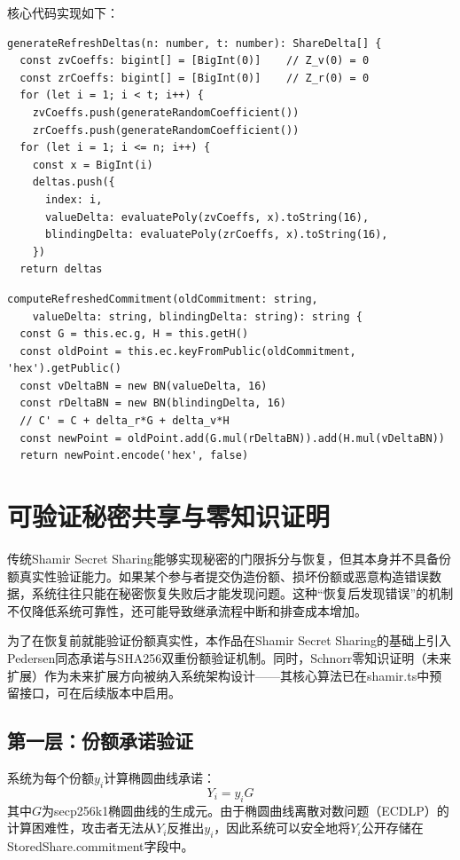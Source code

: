 \documentclass[UTF8,a4paper,zihao=-4,openany]{ctexrep}
\begin{document}
\noindent 核心代码实现如下：

\begin{lstlisting}[caption={零和多项式同态刷新增量生成 (shamir.ts)}]
generateRefreshDeltas(n: number, t: number): ShareDelta[] {
  const zvCoeffs: bigint[] = [BigInt(0)]    // Z_v(0) = 0
  const zrCoeffs: bigint[] = [BigInt(0)]    // Z_r(0) = 0
  for (let i = 1; i < t; i++) {
    zvCoeffs.push(generateRandomCoefficient())
    zrCoeffs.push(generateRandomCoefficient())
  for (let i = 1; i <= n; i++) {
    const x = BigInt(i)
    deltas.push({
      index: i,
      valueDelta: evaluatePoly(zvCoeffs, x).toString(16),
      blindingDelta: evaluatePoly(zrCoeffs, x).toString(16),
    })
  return deltas
\end{lstlisting}

\begin{lstlisting}[caption={承诺同态刷新计算 (shamir.ts)}]
computeRefreshedCommitment(oldCommitment: string,
    valueDelta: string, blindingDelta: string): string {
  const G = this.ec.g, H = this.getH()
  const oldPoint = this.ec.keyFromPublic(oldCommitment, 'hex').getPublic()
  const vDeltaBN = new BN(valueDelta, 16)
  const rDeltaBN = new BN(blindingDelta, 16)
  // C' = C + delta_r*G + delta_v*H
  const newPoint = oldPoint.add(G.mul(rDeltaBN)).add(H.mul(vDeltaBN))
  return newPoint.encode('hex', false)
\end{lstlisting}

\section{可验证秘密共享与零知识证明}

传统Shamir Secret Sharing能够实现秘密的门限拆分与恢复，但其本身并不具备份额真实性验证能力。如果某个参与者提交伪造份额、损坏份额或恶意构造错误数据，系统往往只能在秘密恢复失败后才能发现问题。这种“恢复后发现错误”的机制不仅降低系统可靠性，还可能导致继承流程中断和排查成本增加。

为了在恢复前就能验证份额真实性，本作品在Shamir Secret Sharing的基础上引入Pedersen同态承诺与SHA256双重份额验证机制。同时，Schnorr零知识证明（未来扩展）作为未来扩展方向被纳入系统架构设计——其核心算法已在shamir.ts中预留接口，可在后续版本中启用。

\subsection{第一层：份额承诺验证}

系统为每个份额$y_i$计算椭圆曲线承诺：
\[
Y_i = y_iG
\]
其中$G$为secp256k1椭圆曲线的生成元。由于椭圆曲线离散对数问题（ECDLP）的计算困难性，攻击者无法从$Y_i$反推出$y_i$，因此系统可以安全地将$Y_i$公开存储在StoredShare.commitment字段中。
\end{document}

